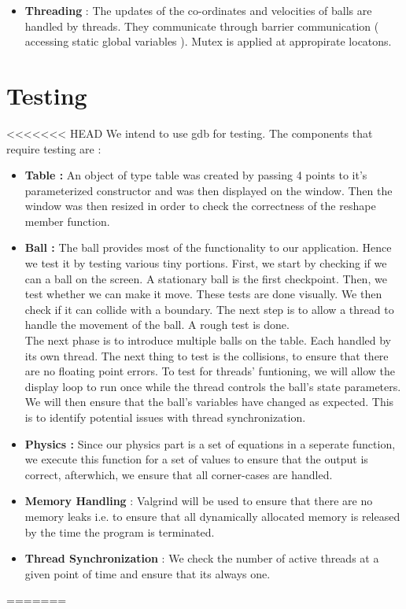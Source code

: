 \documentclass[]{article}
\begin{document}
\begin{itemize}
\begin{flushleft}
\begin{itemize}
\item \textbf{Threading} : The updates of the co-ordinates and velocities of balls are handled by threads. They communicate through barrier communication ( accessing static global variables ). Mutex is applied at appropirate locatons.

\end{itemize}

 

\end{flushleft}

\end{itemize}

\section{Testing}
<<<<<<< HEAD
We intend to use gdb for testing. The components that require testing are :
\begin{itemize}


\item \textbf{Table :}
An object of type table was created by passing 4 points to it's parameterized constructor and was then displayed on the window. Then the window was then resized in order to check the correctness of the reshape member function.
\item \textbf{Ball :}
The ball provides most of the functionality to our application. Hence we test it by testing various tiny portions.
First, we start by checking if we can a ball on the screen. A stationary ball is the first checkpoint. Then, we test whether we can make it move. These tests are done visually. We then check if it can collide with a boundary. The next step is to allow a thread to handle the movement of the ball. A rough test is done. \\
The next phase is to introduce multiple balls on the table. Each handled by its own thread. The next thing to test is the collisions, to ensure that there are no floating point errors.
To test for threads' funtioning, we will allow the display loop to run once while the thread controls the ball's state parameters. We will then ensure that the ball's variables have changed as expected. This is to identify potential issues with thread synchronization.
\item \textbf{Physics :} Since our physics part is a set of equations in a seperate function, we execute this function for a set of values to ensure that the output is correct, afterwhich, we ensure that all corner-cases are handled.
\item \textbf{Memory Handling} : Valgrind will be used to ensure that there are no memory leaks i.e. to ensure that all dynamically allocated memory is released by the time the program is terminated.
\item \textbf{Thread Synchronization} : We check the number of active threads at a given point of time and ensure that its always one.

\end{itemize}
=======
\end{document}
